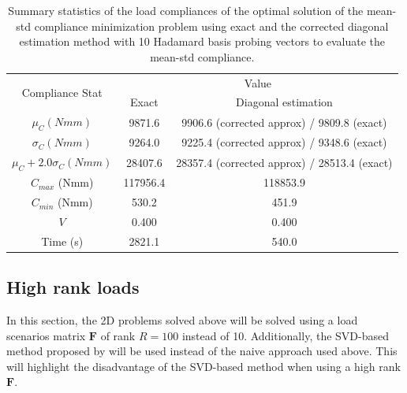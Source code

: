 \begin{table}
 \centering
 \caption{Summary statistics of the load compliances of the optimal solution of the mean-std compliance minimization problem using exact and the corrected diagonal estimation method with 10 Hadamard basis probing vectors to evaluate the mean-std compliance.}
 \begin{tabular}{|c|c|c|}
  \hline
  \multirow{2}{5em}{Compliance Stat} & \multicolumn{2}{c|}{Value} \\\cline{2-3}
  & Exact & Diagonal estimation \\
  \hline
  \hline
  $\mu_C (Nmm) $ & 9871.6 & 9906.6 (corrected approx) / 9809.8 (exact) \\
  \hline
  $\sigma_C (Nmm) $ & 9264.0 & 9225.4 (corrected approx) / 9348.6 (exact) \\
  \hline
  $\mu_C + 2.0 \sigma_C (Nmm) $ & 28407.6 & 28357.4 (corrected approx) / 28513.4 (exact) \\
  \hline
  $C_{max}$ (Nmm) & 117956.4 & 118853.9 \\
  \hline
  $C_{min}$ (Nmm) & 530.2 & 451.9 \\
  \hline
  $V$ & 0.400 & 0.400 \\
  \hline
  Time (s) & 2821.1 & 540.0 \\
  \hline
 \end{tabular}
 \label{tab:mean_std_stats}
\end{table}

\subsection{High rank loads}

  In this section, the 2D problems solved above will be solved using a load scenarios matrix $\bm{F}$ of rank $R = 100$ instead of 10. Additionally, the SVD-based method proposed by \cite{tarek2021robust} will be used instead of the naive approach used above. This will highlight the disadvantage of the SVD-based method when using a high rank $\bm{F}$.
  
